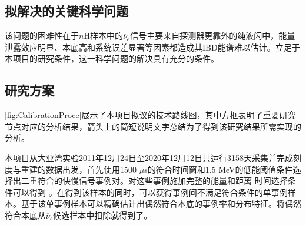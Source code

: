 \documentclass[a4paper,zihao=-4]{article}
\begin{document}
\subsection{拟解决的关键科学问题}

该问题的困难性在于$n$H样本中的$\overline{\nu}_e$信号主要来自探测器更靠外的纯液闪中，能量泄露效应明显、本底高和系统误差显著等因素都造成其IBD能谱难以估计。立足于本项目的研究条件，这一科学问题的解决具有充分的条件。


\subsection{研究方案}

\cref{fig:CalibrationProce}展示了本项目拟议的技术路线图，其中方框表明了重要研究节点对应的分析结果，箭头上的简短说明文字总结为了得到该研究结果所需实现的分析。

本项目从大亚湾实验2011年12月24日至2020年12月12日共运行3158天采集并完成刻度与重建的数据出发，首先使用1500 $\mu$s的符合时间窗和1.5 MeV的低能阈值条件选择出二重符合的快慢信号事例对。对这些事例施加完整的能量和距离-时间选择条件可以得到 。在得到该样本的同时，可以获得事例间不满足符合条件的单事例样本。基于该单事例样本可以精确估计出偶然符合本底的事例率和分布特征。将偶然符合本底从$\overline{\nu}_e$候选样本中扣除就得到了。
\end{document}
